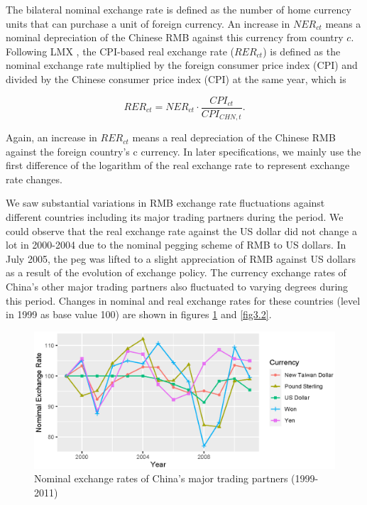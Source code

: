The bilateral nominal exchange rate is defined as the number of home currency units that can purchase a unit of foreign currency. An increase in $NER_{ct}$ means a nominal depreciation of the Chinese RMB against this currency from country $c$. Following LMX \cite{lmx2015}, the CPI-based real exchange rate ($RER_{ct}$) is defined as the nominal exchange rate multiplied by the foreign consumer price index (CPI) and divided by the Chinese consumer price index (CPI) at the same year, which is

$$
RER_{ct}=NER_{ct} \cdot \frac{CPI_{ct}}{CPI_{CHN,t}}.
$$

Again, an increase in $RER_{ct}$ means a real depreciation of the Chinese RMB against the foreign country's c currency. In later specifications, we mainly use the first difference of the logarithm of the real exchange rate to represent exchange rate changes.

We saw substantial variations in RMB exchange rate fluctuations against different countries including its major trading partners during the period. We could observe that the real exchange rate against the US dollar did not change a lot in 2000-2004 due to the nominal pegging scheme of RMB to US dollars. In July 2005, the peg was lifted to a slight appreciation of RMB against US dollars as a result of the evolution of exchange policy. The currency exchange rates of China's other major trading partners also fluctuated to varying degrees during this period. Changes in nominal and real exchange rates for these countries (level in 1999 as base value 100) are shown in figures \ref{fig3.1} and \ref{fig3.2}.

\begin{figure}[htbp]
	\centering
	\includegraphics[width=1\textwidth]{figure/figure1.eps}
	\caption{Nominal exchange rates of China's major trading partners (1999-2011)}
	\label{fig3.1}
\end{figure}

